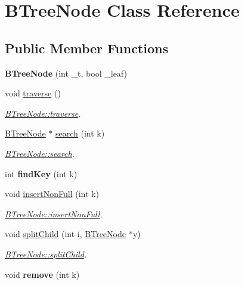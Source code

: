 \hypertarget{classBTreeNode}{}\section{B\+Tree\+Node Class Reference}
\label{classBTreeNode}
\subsection*{Public Member Functions}
\begin{DoxyCompactItemize}
\item 
{\bfseries B\+Tree\+Node} (int \+\_\+t, bool \+\_\+leaf)\hypertarget{classBTreeNode_a77bdc171cacfca17e7e6a0748303b188}{}\label{classBTreeNode_a77bdc171cacfca17e7e6a0748303b188}

\item 
void \hyperlink{classBTreeNode_abbbbc81dc44a25f7c1d31461a25284da}{traverse} ()
\begin{DoxyCompactList}\small\item\em \hyperlink{classBTreeNode_abbbbc81dc44a25f7c1d31461a25284da}{B\+Tree\+Node\+::traverse}. \end{DoxyCompactList}\item 
\hyperlink{classBTreeNode}{B\+Tree\+Node} $\ast$ \hyperlink{classBTreeNode_a6efde11b5f5d60718992ab1803262c88}{search} (int k)
\begin{DoxyCompactList}\small\item\em \hyperlink{classBTreeNode_a6efde11b5f5d60718992ab1803262c88}{B\+Tree\+Node\+::search}. \end{DoxyCompactList}\item 
int {\bfseries find\+Key} (int k)\hypertarget{classBTreeNode_abe135dadefdbc33ef0a8f5722b1e2cc5}{}\label{classBTreeNode_abe135dadefdbc33ef0a8f5722b1e2cc5}

\item 
void \hyperlink{classBTreeNode_aab8552d41662b83059a6f1e149b55ad9}{insert\+Non\+Full} (int k)
\begin{DoxyCompactList}\small\item\em \hyperlink{classBTreeNode_aab8552d41662b83059a6f1e149b55ad9}{B\+Tree\+Node\+::insert\+Non\+Full}. \end{DoxyCompactList}\item 
void \hyperlink{classBTreeNode_ad4d6359429aa7bb6edc30aaf1a4d2bb9}{split\+Child} (int i, \hyperlink{classBTreeNode}{B\+Tree\+Node} $\ast$y)
\begin{DoxyCompactList}\small\item\em \hyperlink{classBTreeNode_ad4d6359429aa7bb6edc30aaf1a4d2bb9}{B\+Tree\+Node\+::split\+Child}. \end{DoxyCompactList}\item 
void {\bfseries remove} (int k)\hypertarget{classBTreeNode_afed908ff3266afec02a660a84472e9c3}{}\label{classBTreeNode_afed908ff3266afec02a660a84472e9c3}


\end{DoxyCompactItemize}
